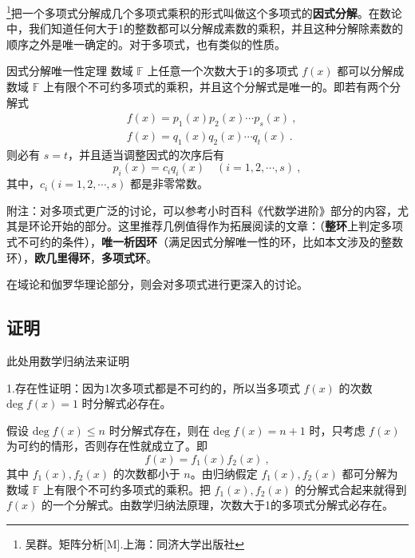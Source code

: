 
\footnote{吴群。矩阵分析[M].上海：同济大学出版社}把一个多项式分解成几个多项式乘积的形式叫做这个多项式的\textbf{因式分解}。在数论中，我们知道任何大于1的整数都可以分解成素数的乘积，并且这种分解除素数的顺序之外是唯一确定的。对于多项式，也有类似的性质。
\begin{theorem}{因式分解唯一性定理}
数域 $\mathbb{F}$ 上任意一个次数大于1的多项式 $f(x)$ 都可以分解成数域 $\mathbb{F}$ 上有限个不可约多项式的乘积，并且这个分解式是唯一的。即若有两个分解式
 \begin{equation}
 \begin{aligned}
 &f(x)=p_1(x)p_2(x)\cdots p_s(x)~,\\
 &f(x)=q_1(x)q_2(x)\cdots q_t(x)~.
 \end{aligned}
 \end{equation}
 则必有 $s=t$，并且适当调整因式的次序后有
 \begin{equation}
 p_i(x)=c_iq_i(x)\quad (i=1,2,\cdots,s)~,
 \end{equation}
 其中，$c_i(i=1,2,\cdots,s)$ 都是非零常数。
\end{theorem}


附注：对多项式更广泛的讨论，可以参考小时百科《代数学进阶》部分的内容，尤其是环论开始的部分。这里推荐几例值得作为拓展阅读的文章：（\textbf{整环}上判定多项式不可约的条件），\textbf{唯一析因环}（满足因式分解唯一性的环，比如本文涉及的整数环），\textbf{欧几里得环}，\textbf{多项式环}。

在域论和伽罗华理论部分，则会对多项式进行更深入的讨论。


\subsection{证明}此处用数学归纳法来证明

1.存在性证明：因为1次多项式都是不可约的，所以当多项式 $f(x)$ 的次数 $\mathrm{deg}\;f(x)=1$ 时分解式必存在。

假设 $\mathrm{deg}\;f(x)\leq n$ 时分解式存在，则在 $\mathrm{deg}\;f(x)=n+1$ 时，只考虑 $f(x)$ 为可约的情形，否则存在性就成立了。即
\begin{equation}
f(x)=f_1(x)f_2(x)~,
\end{equation}
其中 $f_1(x),f_2(x)$ 的次数都小于 $n$。由归纳假定 $f_1(x),f_2(x)$ 都可分解为数域 $\mathbb{F}$ 上有限个不可约多项式的乘积。把 $f_1(x),f_2(x)$ 的分解式合起来就得到 $f(x)$ 的一个分解式。由数学归纳法原理，次数大于1的多项式分解式必存在。

